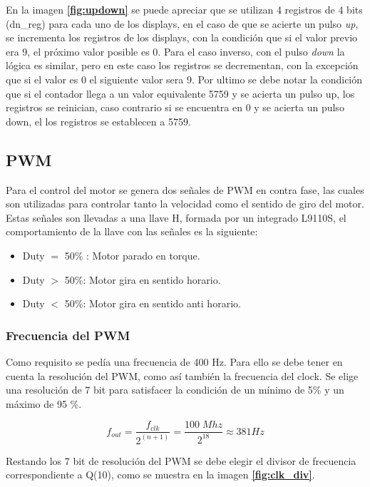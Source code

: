 \documentclass[11pt, a4paper]{article}
\begin{document}
		En la imagen \textcolor{blue}{\textbf{\ref{fig:updown}}} se puede apreciar que se utilizan 4 registros de 4 bits (dn\_reg) para cada uno de los displays, en el caso de que se acierte un pulso \textit{up}, se incrementa los registros de los displays, con la condición que si el valor previo era 9, el próximo valor posible es 0. Para el caso inverso, con el pulso \textit{down} la lógica es similar, pero en este caso los registros se decrementan, con la excepción que si el valor es 0 el siguiente valor sera 9.
		Por ultimo se debe notar la condición que si el contador llega a un valor equivalente 5759 y se acierta un pulso up, los registros se reinician, caso contrario si se encuentra en 0 y se acierta un pulso down, el los registros se establecen a 5759.
	
		\subsection{PWM}
			Para el control del motor se genera dos señales de PWM en contra fase, las cuales son utilizadas para controlar tanto la velocidad como el sentido de giro del motor. Estas señales son llevadas a una llave H, formada por un integrado L9110S, el comportamiento de la llave con las señales es la siguiente:
			\begin{itemize}
				\item{Duty $=$ 50\%} : Motor parado en torque.
				\item{Duty $>$ 50\%}: Motor gira en sentido horario.
				\item{Duty $<$ 50\%}: Motor gira en sentido anti horario.
			\end{itemize}

			\subsubsection{Frecuencia del PWM}
				Como requisito se pedía una frecuencia de 400 Hz. Para ello se debe tener en cuenta la resolución del PWM, como así también la frecuencia del clock. Se elige una resolución de 7 bit para satisfacer la condición de un mínimo de 5\% y un máximo de 95 \%. 

				\begin{equation}
					f_{out} = \frac{f_{clk}}{2^{(n+1)}} = \frac{100\;Mhz}{2^18} \approx 381 Hz
				\end{equation}
	
				Restando los 7 bit de resolución del PWM se debe elegir el divisor de frecuencia correspondiente a Q(10), como se muestra en la imagen \textcolor{blue}{\textbf{\ref{fig:clk_div}}}.
\end{document}
